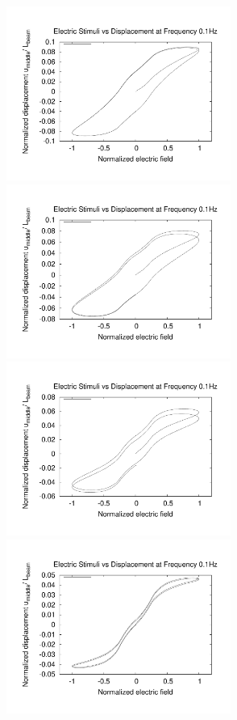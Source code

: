 \begin{figure}
\centering 
{} 
{\includegraphics[width=2.9in]{./chap_5_active_trusses/truss_freq_study/truss_nonlinear_freq_0p1.pdf}}
{\includegraphics[width=2.9in]{./chap_5_active_trusses/truss_freq_study/truss_nonlinear_freq_0p2.pdf}}
{\includegraphics[width=2.9in]{./chap_5_active_trusses/truss_freq_study/truss_nonlinear_freq_0p5.pdf}}
{\includegraphics[width=2.9in]{./chap_5_active_trusses/truss_freq_study/truss_nonlinear_freq_2p0.pdf}}

\end{figure}
